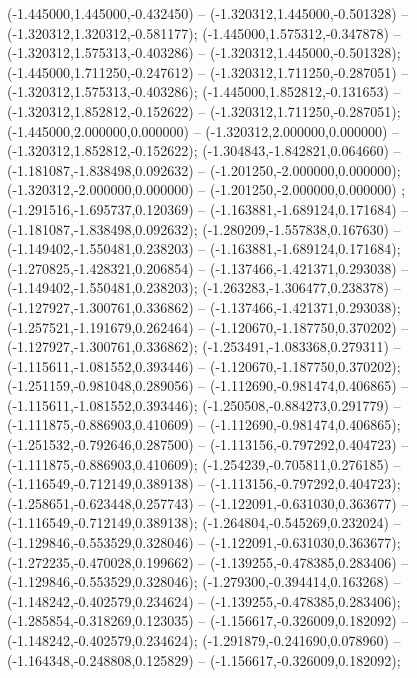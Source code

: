  (-1.445000,1.445000,-0.432450) -- (-1.320312,1.445000,-0.501328) -- (-1.320312,1.320312,-0.581177);
 (-1.445000,1.575312,-0.347878) -- (-1.320312,1.575313,-0.403286) -- (-1.320312,1.445000,-0.501328);
 (-1.445000,1.711250,-0.247612) -- (-1.320312,1.711250,-0.287051) -- (-1.320312,1.575313,-0.403286);
 (-1.445000,1.852812,-0.131653) -- (-1.320312,1.852812,-0.152622) -- (-1.320312,1.711250,-0.287051);
 (-1.445000,2.000000,0.000000) -- (-1.320312,2.000000,0.000000) -- (-1.320312,1.852812,-0.152622);
 (-1.304843,-1.842821,0.064660) -- (-1.181087,-1.838498,0.092632) -- (-1.201250,-2.000000,0.000000);
 (-1.320312,-2.000000,0.000000) -- (-1.201250,-2.000000,0.000000) ;
 (-1.291516,-1.695737,0.120369) -- (-1.163881,-1.689124,0.171684) -- (-1.181087,-1.838498,0.092632);
 (-1.280209,-1.557838,0.167630) -- (-1.149402,-1.550481,0.238203) -- (-1.163881,-1.689124,0.171684);
 (-1.270825,-1.428321,0.206854) -- (-1.137466,-1.421371,0.293038) -- (-1.149402,-1.550481,0.238203);
 (-1.263283,-1.306477,0.238378) -- (-1.127927,-1.300761,0.336862) -- (-1.137466,-1.421371,0.293038);
 (-1.257521,-1.191679,0.262464) -- (-1.120670,-1.187750,0.370202) -- (-1.127927,-1.300761,0.336862);
 (-1.253491,-1.083368,0.279311) -- (-1.115611,-1.081552,0.393446) -- (-1.120670,-1.187750,0.370202);
 (-1.251159,-0.981048,0.289056) -- (-1.112690,-0.981474,0.406865) -- (-1.115611,-1.081552,0.393446);
 (-1.250508,-0.884273,0.291779) -- (-1.111875,-0.886903,0.410609) -- (-1.112690,-0.981474,0.406865);
 (-1.251532,-0.792646,0.287500) -- (-1.113156,-0.797292,0.404723) -- (-1.111875,-0.886903,0.410609);
 (-1.254239,-0.705811,0.276185) -- (-1.116549,-0.712149,0.389138) -- (-1.113156,-0.797292,0.404723);
 (-1.258651,-0.623448,0.257743) -- (-1.122091,-0.631030,0.363677) -- (-1.116549,-0.712149,0.389138);
 (-1.264804,-0.545269,0.232024) -- (-1.129846,-0.553529,0.328046) -- (-1.122091,-0.631030,0.363677);
 (-1.272235,-0.470028,0.199662) -- (-1.139255,-0.478385,0.283406) -- (-1.129846,-0.553529,0.328046);
 (-1.279300,-0.394414,0.163268) -- (-1.148242,-0.402579,0.234624) -- (-1.139255,-0.478385,0.283406);
 (-1.285854,-0.318269,0.123035) -- (-1.156617,-0.326009,0.182092) -- (-1.148242,-0.402579,0.234624);
 (-1.291879,-0.241690,0.078960) -- (-1.164348,-0.248808,0.125829) -- (-1.156617,-0.326009,0.182092);
